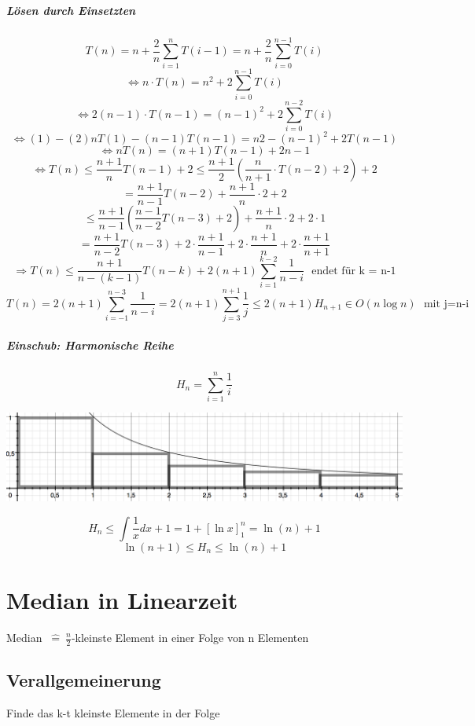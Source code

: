 \paragraph{Lösen durch Einsetzten}
\[T(n) = n + \frac{2}{n} \sum_{i=1}^n T(i-1) = n + \frac{2}{n} \sum_{i=0}^{n-1} T(i)\]
\[ \Leftrightarrow n \cdot T(n) = n^2 + 2 \sum_{i=0}^{n-1} T(i) \]
\[ \Leftrightarrow 2(n-1) \cdot T(n-1) = (n-1)^2 + 2 \sum_{i=0}^{n-2} T(i) \]
\[ \Leftrightarrow (1)-(2) n T(1)-(n-1) T(n-1) = n2 -(n-1)^2 + 2 T(n-1) \]
\[ \Leftrightarrow n T(n) = (n+1) T(n-1) + 2n-1 \]
\[ \Leftrightarrow T(n) \leq \frac{n+1}{n} T(n-1) + 2 \leq \frac{n+1}{2} \left(\frac{n}{n+1} \cdot T(n-2) + 2 \right) + 2 \]
\[ = \frac{n+1}{n-1} T(n-2) + \frac{n+1}{n} \cdot 2 + 2\]
\[ \leq \frac{n+1}{n-1} \left(\frac{n-1}{n-2} T(n-3) +2 \right) + \frac{n+1}{n} \cdot 2 + 2 \cdot 1\]
\[= \frac{n+1}{n-2} T(n-3) + 2 \cdot \frac{n+1}{n-1} + 2 \cdot \frac{n+1}{n} + 2 \cdot \frac{n+1}{n+1} \]
\[ \Rightarrow T(n) \leq \frac{n+1}{n-(k-1)} T(n-k) + 2(n+1) \sum_{i=1}^{k-2} \frac{1}{n-i} ~~~\text{endet für k = n-1}\]
\[ T(n) = 2(n+1) \sum_{i=-1}^{n-3} \frac{1}{n-i} = 2(n+1) \sum_{j=3}^{n+1} \frac{1}{j} \leq 2 (n+1) H_{n+1} \in O(n \log n) ~~~\text{mit j=n-i} \] 

\begin{mdframed}
\paragraph{Einschub: Harmonische Reihe}
\[ H_n = \sum_{i=1}^{n} \frac{1}{i} \]

\includegraphics[width=\linewidth]{06/Grafik/img4.png}


\[H_n \leq \int \frac{1}{x} dx +1 = 1 + [\ln x]_1^n = \ln(n)+1 \]
\[\ln(n+1) \leq H_n \leq \ln(n)+1 \]
\end{mdframed}

\pagebreak 

\chapter{Median in Linearzeit}
Median  $~\hat{=}~ \frac{n}{2} $-kleinste Element in einer Folge von n Elementen

\section{Verallgemeinerung}
Finde das k-t kleinste Elemente in der Folge\\


